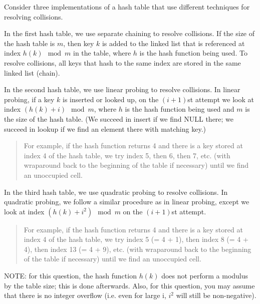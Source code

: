 \documentclass[12pt]{exam}
\begin{document}
\newpage
\begin{questions}



Consider three implementations of a hash table that use different techniques
for resolving collisions.

In the first hash table, we use separate chaining to resolve collisions.
If the size of the hash table is $m$, then key $k$ is added to the linked
list that is referenced at index $h(k) \mod m$ in the table, where $h$ is the hash function
being used. To resolve collisions, all keys that
hash to the same index are stored in the same linked list (chain).

In the second hash table, we use linear probing to resolve collisions.
In linear probing, if a key $k$ is inserted or looked up, on
the $(i+1)$st attempt we look at index $(h(k) + i) \mod m$, where $h$
is the hash function being used and $m$ is the size of the hash table. (We
succeed in insert if we find NULL there; we succeed in lookup if we
find an element there with matching key.)

\begin{quote}
For example, if the hash function returns 4 and there is a key stored at index 4
of the hash table, we try index 5, then 6, then 7, etc. (with wraparound
back to the beginning of the table if necessary) until we find an unoccupied cell.
\end{quote}

In the third hash table, we use quadratic probing to resolve collisions.
In quadratic probing, we follow a similar procedure as in linear probing,
except we look at index $(h(k) + i^2) \mod m$ on the $(i+1)$st attempt.

\begin{quote}
For example, if the hash function returns 4 and there is a key stored at index 4
of the hash table, we try index 5 (= 4 + 1), then index 8 (= 4 + 4), then index 13 (= 4 + 9), etc. (with wraparound
back to the beginning of the table if necessary) until we find an unoccupied cell.
\end{quote}

NOTE: for this question, the hash function $h(k)$ does not perform
a modulus by the table size; this is done afterwards.  Also, for this question, you may assume
that there is no integer overflow (i.e. even for large i, $i^2$ will
still be non-negative).

\vspace{0.5in}
\begin{parts}


\end{parts}
\end{questions}
\end{document}
